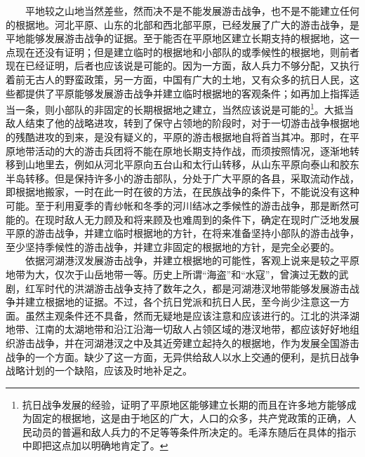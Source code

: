 \documentclass[cn,11pt,chinese]{elegantbook}
\begin{document}
　　平地较之山地当然差些，然而决不是不能发展游击战争，也不是不能建立任何的根据地。河北平原、山东的北部和西北部平原，已经发展了广大的游击战争，是平地能够发展游击战争的证据。至于能否在平原地区建立长期支持的根据地，这一点现在还没有证明；但是建立临时的根据地和小部队的或季候性的根据地，则前者现在已经证明，后者也应该说是可能的。因为一方面，敌人兵力不够分配，又执行着前无古人的野蛮政策，另一方面，中国有广大的土地，又有众多的抗日人民，这些都提供了平原能够发展游击战争并建立临时根据地的客观条件；如再加上指挥适当一条，则小部队的非固定的长期根据地之建立，当然应该说是可能的\footnote[7]{ 抗日战争发展的经验，证明了平原地区能够建立长期的而且在许多地方能够成为固定的根据地，这是由于地区的广大，人口的众多，共产党政策的正确，人民动员的普遍和敌人兵力的不足等等条件所决定的。毛泽东随后在具体的指示中即把这点加以明确地肯定了。}。大抵当敌人结束了他的战略进攻，转到了保守占领地的阶段时，对于一切游击战争根据地的残酷进攻的到来，是没有疑义的，平原的游击根据地自将首当其冲。那时，在平原地带活动的大的游击兵团将不能在原地长期支持作战，而须按照情况，逐渐地转移到山地里去，例如从河北平原向五台山和太行山转移，从山东平原向泰山和胶东半岛转移。但是保持许多小的游击部队，分处于广大平原的各县，采取流动作战，即根据地搬家，一时在此一时在彼的方法，在民族战争的条件下，不能说没有这种可能。至于利用夏季的青纱帐和冬季的河川结冰之季候性的游击战争，那是断然可能的。在现时敌人无力顾及和将来顾及也难周到的条件下，确定在现时广泛地发展平原的游击战争，并建立临时根据地的方针，在将来准备坚持小部队的游击战争，至少坚持季候性的游击战争，并建立非固定的根据地的方针，是完全必要的。\\
　　依据河湖港汊发展游击战争，并建立根据地的可能性，客观上说来是较之平原地带为大，仅次于山岳地带一等。历史上所谓“海盗”和“水寇”，曾演过无数的武剧，红军时代的洪湖游击战争支持了数年之久，都是河湖港汊地带能够发展游击战争并建立根据地的证据。不过，各个抗日党派和抗日人民，至今尚少注意这一方面。虽然主观条件还不具备，然而无疑地是应该注意和应该进行的。江北的洪泽湖地带、江南的太湖地带和沿江沿海一切敌人占领区域的港汊地带，都应该好好地组织游击战争，并在河湖港汊之中及其近旁建立起持久的根据地，作为发展全国游击战争的一个方面。缺少了这一方面，无异供给敌人以水上交通的便利，是抗日战争战略计划的一个缺陷，应该及时地补足之。\\
\end{document}
